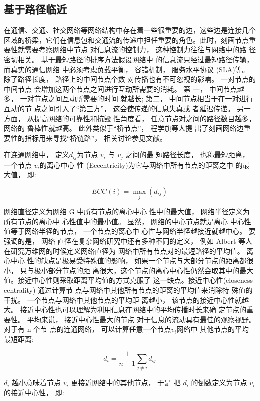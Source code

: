 	\subsection{基于路径临近}
		在通信、交通、社交网络等网络结构中存在着一些很重要的边，这些边是连接几个区域的桥梁，它们在信息包和交通流的传递中担任重要的角色。此时，刻画节点重要性就需要考察网络中节点 对信息流的控制力， 这种控制力往往与网络中的路 径密切相关。 基于最短路径的排序方法假设网络中 的信息流只经过最短路径传输， 而真实的通信网络 中必须考虑负载平衡， 容错机制， 服务水平协议 (SLA)等\parencite{Dolev2010Routing}。 除了路径长度， 路径上的中间节点个数 对传播也有不可忽视的影响。 一对节点的中间节点 会增加这两个节点之间进行互动所需要的消耗。 第 一， 中间节点越多， 一对节点之间互动所需要的时间 就越长; 第二， 中间节点相当于在一对进行互动的节 点之间引入了“第三方”， 这会使传递的信息失真或 者延迟传递。 另一方面， 从提高网络的可靠性和抗毁 性角度看， 任意节点对之间的路径数目越多， 网络的 鲁棒性就越高。 此外类似于“桥节点”， 程学旗等人提 出了刻画网络边重要性的指标用来寻找“桥链路”， 相关讨论参见文献\parencite{Cheng2010Bridgeness}。

	在连通网络中， 定义$d_{ij}$为节点 $v_i$ 与 $v_j$ 之间的最 短路径长度， 也称最短距离， 一个节点 $v_i$的离心中心 性 (Eccentricity)为它与网络中所有节点的距离之中 的最大值\parencite{Hage1995Eccentricity}， 即:

\[ECC(i) = {\max _j}({d_{ij}})\]

				网络直径定义为网络 G 中所有节点的离心中心 性中的最大值， 网络半径定义为所有节点的离心中 心性值中的最小值。 显然， 网络的中心节点就是离心 中心性值等于网络半径的节点， 一个节点的离心中 心性与网络半径越接近就越中心。 要强调的是， 网络 直径在复杂网络研究中还有多种不同的定义， 例如 Albert 等人在研究万维网的时候定义网络直径为 网络中所有节点对的最短路径的平均值\parencite{Miro1997The}。 离心中心 性的缺点是极易受特殊值的影响， 如果一个节点与大部分节点的距离都很小， 只与极小部分节点的距 离很大，这个节点的离心中心性仍然会取其中的最大值。接近中心性则采取距离平均值的方式克服了 这一缺点。接近中心性(closeness centrality) 通过计算节
	点与网络中其他所有节点的距离的平均值来消除特 殊值的干扰。 一个节点与网络中其他节点的平均距 离越小， 该节点的接近中心性就越大。 接近中心性也可以理解为利用信息在网络中的平均传播时长来确
	定节点的重要性。 平均来说， 接近中心性最大的节点 对于信息的流动具有最佳的观察视野。 对于有 n 个节 点的连通网络， 可以计算任意一个节点$v_i$网络中 其他节点的平均最短距离:

\[{d_i} = \frac{1}{{n - 1}}\sum\limits_{j \ne i} {{d_{ij}}} \]

				$d_i$ 越小意味着节点 $v_i$ 更接近网络中的其他节点， 于是 把 $d_i$ 的倒数定义为节点 $v_i$ 的接近中心性， 即:

